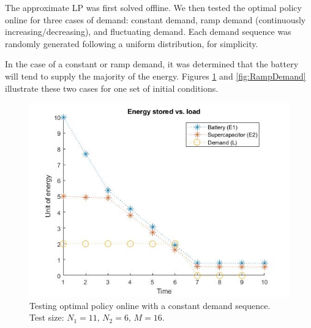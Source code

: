 \documentclass[conference]{IEEEtran}
\begin{document}
The approximate LP was first solved offline. We then tested the optimal policy online for three cases of demand: constant demand, ramp demand (continuously increasing/decreasing), and fluctuating demand. Each demand sequence was randomly generated following a uniform distribution, for simplicity. %

In the case of a constant or ramp demand, it was determined that the battery will tend to supply the majority of the energy. Figures \ref{fig:ConstDemand} and \ref{fig:RampDemand} illustrate these two cases for one set of initial conditions.
\begin{figure}[htbp]
\centerline{\includegraphics[scale=0.35]{EnergyStoredvsload_ConstantLoad(E1_max=10,E2_max=5).jpg}}
\caption{Testing optimal policy online with a constant demand sequence. Test size: $N_{1}=11$, $N_{2}=6$, $M=16$.}
\label{fig:ConstDemand}
\end{figure}
\end{document}
